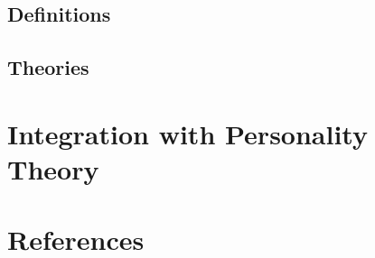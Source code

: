 \documentclass[xcolor=x11names,compress]{beamer}\usepackage[]{graphicx}\usepackage[]{color}
\renewcommand{\(}{\begin{columns}}
\renewcommand{\)}{\end{columns}}
\newcommand{\<}[1]{\begin{column}{#1}}
\renewcommand{\>}{\end{column}}
\begin{document}






\subsection{Definitions}


\subsection{Theories}



\section{Integration with Personality Theory}
%






\section{References}

\end{document}

